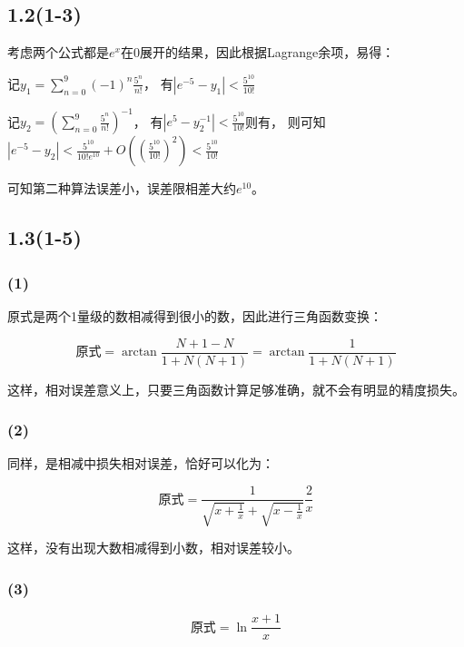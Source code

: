 \documentclass[UTF8,zihao=5]{ctexart}
\begin{document}
\subsection*{1.2(1-3)}

考虑两个公式都是$e^x$在$0$展开的结果，因此根据Lagrange余项，易得：

记$y_1=\sum_{n=0}^9{(-1)^n\frac{5^n}{n!}}$，
有$\left|e^{-5}-y_1\right|<\frac{5^{10}}{10!}$

记$y_2=\left(\sum_{n=0}^9{\frac{5^n}{n!}}\right)^{-1}$，
有$\left|e^{5}-y_2^{-1}\right|<\frac{5^{10}}{10!}$则有，
则可知$\left|e^{-5}-y_2\right|<\frac{5^{10}}{10!e^{10}}
    +O\left(\left(\frac{5^{10}}{10!}\right)^2\right)<\frac{5^{10}}{10!}$

可知第二种算法误差小，误差限相差大约$e^{10}$。

\subsection*{1.3(1-5)}

\subsubsection*{(1)}

原式是两个1量级的数相减得到很小的数，因此进行三角函数变换：

\begin{equation*}
    \text{原式}=\arctan{\frac{N+1-N}{1+N(N+1)}}=\arctan{\frac{1}{1+N(N+1)}}
\end{equation*}

这样，相对误差意义上，只要三角函数计算足够准确，就不会有明显的精度损失。

\subsubsection*{(2)}

同样，是相减中损失相对误差，恰好可以化为：

\begin{equation*}
    \text{原式}=\frac{1}{\sqrt{x+\frac{1}{x}}+\sqrt{x-\frac{1}{x}}}\frac{2}{x}
\end{equation*}

这样，没有出现大数相减得到小数，相对误差较小。

\subsubsection*{(3)}

\begin{equation*}
    \text{原式}=\ln{\frac{x+1}{x}}
\end{equation*}
\end{document}
